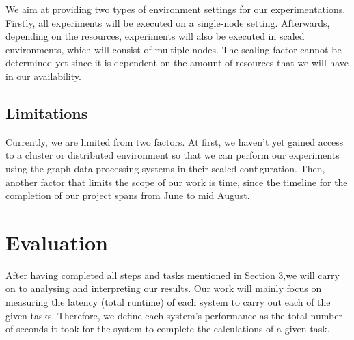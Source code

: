 \documentclass[a4paper,11pt]{article}
\begin{document}
\par We aim at providing two types of environment settings for our experimentations. Firstly, all experiments will be executed on a single-node setting. Afterwards, depending on the resources, experiments will also be executed in scaled environments, which will consist of multiple nodes. The scaling factor cannot be determined yet since it is dependent on the amount of resources that we will have in our availability.

\subsection{Limitations} \label{limitations}

Currently, we are limited from two factors. At first, we haven't yet gained access to a cluster or distributed environment so that we can perform our experiments using the graph data processing systems in their scaled configuration. Then, another factor that limits the scope of our work is time, since the timeline for the completion of our project spans from June to mid August.


\section{Evaluation} \label{evaluation}

\par After having completed all steps and tasks mentioned in \hyperref[methodology]{Section 3},we will carry on to analysing and interpreting our results. Our work will mainly focus on measuring the latency (total runtime) of each system to carry out each of the given tasks. Therefore, we define each system's performance as the total number of seconds it took for the system to complete the calculations of a given task.
\end{document}
